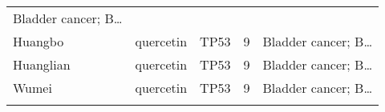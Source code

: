 \documentclass[
]{article}
\begin{document}
\begin{longtable}[]{@{}lllll@{}}
\begin{minipage}[t]{0.21\columnwidth}
Bladder cancer; B\ldots{}\strut
\end{minipage}\tabularnewline
\begin{minipage}[t]{0.17\columnwidth}\raggedright
Huangbo\strut
\end{minipage} & \begin{minipage}[t]{0.16\columnwidth}\raggedright
quercetin\strut
\end{minipage} & \begin{minipage}[t]{0.12\columnwidth}\raggedright
TP53\strut
\end{minipage} & \begin{minipage}[t]{0.19\columnwidth}\raggedright
9\strut
\end{minipage} & \begin{minipage}[t]{0.21\columnwidth}\raggedright
Bladder cancer; B\ldots{}\strut
\end{minipage}\tabularnewline
\begin{minipage}[t]{0.17\columnwidth}\raggedright
Huanglian\strut
\end{minipage} & \begin{minipage}[t]{0.16\columnwidth}\raggedright
quercetin\strut
\end{minipage} & \begin{minipage}[t]{0.12\columnwidth}\raggedright
TP53\strut
\end{minipage} & \begin{minipage}[t]{0.19\columnwidth}\raggedright
9\strut
\end{minipage} & \begin{minipage}[t]{0.21\columnwidth}\raggedright
Bladder cancer; B\ldots{}\strut
\end{minipage}\tabularnewline
\begin{minipage}[t]{0.17\columnwidth}\raggedright
Wumei\strut
\end{minipage} & \begin{minipage}[t]{0.16\columnwidth}\raggedright
quercetin\strut
\end{minipage} & \begin{minipage}[t]{0.12\columnwidth}\raggedright
TP53\strut
\end{minipage} & \begin{minipage}[t]{0.19\columnwidth}\raggedright
9\strut
\end{minipage} & \begin{minipage}[t]{0.21\columnwidth}\raggedright
Bladder cancer; B\ldots{}\strut
\end{minipage}\tabularnewline
\begin{minipage}[t]{0.17\columnwidth}\raggedright

\end{minipage}
\end{longtable}
\end{document}
